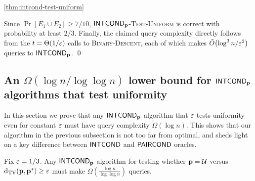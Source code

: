 \begin{proofof}{\cref{thm:intcond-test-uniform}}
\begin{description}
\begin{itemize}
  \end{itemize}

\end{description}

Since $\Pr[E_1\cup E_2] \geq 7/10$, \textsc{${\sf INTCOND}_{\mathbf{p}}$-Test-Uniform} is
correct with probability at least $2/3$. Finally, the claimed query
complexity directly follows from the $t=\Theta(1/\varepsilon)$ calls to
\textsc{Binary-Descent}, each of which makes $\tildeO{ \log^3 n/\eps^2 }$ queries to ${\sf INTCOND}_{\mathbf{p}}$.
\qed



\subsection{An \texorpdfstring{$\Omega(\log n/\log \log n)$}{Omega(log n/ log log n)} lower bound for \texorpdfstring{${\sf INTCOND}_{\mathbf{p}}$}{\ICOND} algorithms that test uniformity} \label{ssec:unif-lb:intcond}

In this section we prove that any ${\sf INTCOND}_{\mathbf{p}}$ algorithm that $\varepsilon$-tests
uniformity even for constant $\varepsilon$
must have query complexity $\tilde{\Omega}(\log n).$
This shows that our algorithm in the previous subsection is not too
far from optimal, and sheds light on a key difference between ${\sf INTCOND}$ and
${\sf PAIRCOND}$ oracles.

\begin{theorem}\label{thm:intcond-test-uniform:lb}
Fix $\varepsilon=1/3$. Any ${\sf INTCOND}_{\mathbf{p}}$ algorithm for testing whether $\mathbf{p} = \mathcal{U}$
versus \mbox{$\operatorname{d}_{\textrm{TV}}(\mathbf{p},\mathbf{p}^\ast) \geq \varepsilon$} must make $\Omega\!\left(\frac{\log n}{\log \log n}\right)$ queries.
\end{theorem}


\end{proofof}
